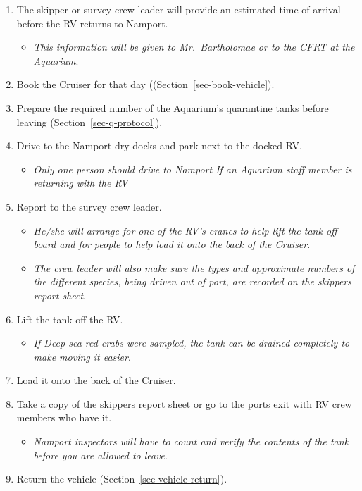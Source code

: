 \documentclass[
  letterpaper,
  DIV=11,
  numbers=noendperiod]{scrreprt}
\providecommand{\tightlist}{%
  \setlength{\itemsep}{0pt}\setlength{\parskip}{0pt}}\usepackage{longtable,booktabs,array}
\begin{document}
\begin{enumerate}
\def\labelenumi{\arabic{enumi}.}
\setcounter{enumi}{19}
\tightlist
\item
  The skipper or survey crew leader will provide an estimated time of
  arrival before the RV returns to Namport.

  \begin{itemize}
  \tightlist
  \item
    \emph{This information will be given to Mr.~Bartholomae or to the
    CFRT at the Aquarium}.
  \end{itemize}
\item
  Book the Cruiser for that day ((Section~\ref{sec-book-vehicle}).
\item
  Prepare the required number of the Aquarium's quarantine tanks before
  leaving (Section~\ref{sec-q-protocol}).
\item
  Drive to the Namport dry docks and park next to the docked RV.

  \begin{itemize}
  \tightlist
  \item
    \emph{Only one person should drive to Namport If an Aquarium staff
    member is returning with the RV}
  \end{itemize}
\item
  Report to the survey crew leader.

  \begin{itemize}
  \tightlist
  \item
    \emph{He/she will arrange for one of the RV's cranes to help lift
    the tank off board and for people to help load it onto the back of
    the Cruiser}.
  \item
    \emph{The crew leader will also make sure the types and approximate
    numbers of the different species, being driven out of port, are
    recorded on the skippers report sheet}.
  \end{itemize}
\item
  Lift the tank off the RV.

  \begin{itemize}
  \tightlist
  \item
    \emph{If Deep sea red crabs were sampled, the tank can be drained
    completely to make moving it easier}.
  \end{itemize}
\item
  Load it onto the back of the Cruiser.
\item
  Take a copy of the skippers report sheet or go to the ports exit with
  RV crew members who have it.

  \begin{itemize}
  \tightlist
  \item
    \emph{Namport inspectors will have to count and verify the contents
    of the tank before you are allowed to leave}.
  \end{itemize}
\item
  Return the vehicle (Section~\ref{sec-vehicle-return}).
\end{enumerate}
\end{document}
